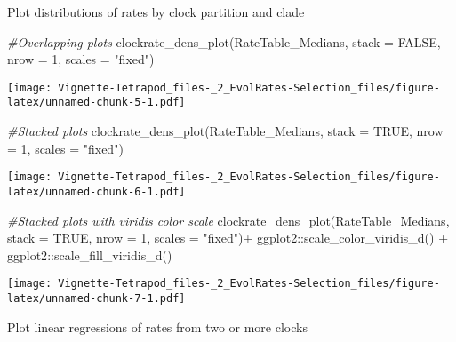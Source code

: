 \documentclass[
]{article}
\newenvironment{Shaded}{\begin{snugshade}}{\end{snugshade}}
\newcommand{\AttributeTok}[1]{\textcolor[rgb]{0.77,0.63,0.00}{#1}}
\newcommand{\CommentTok}[1]{\textcolor[rgb]{0.56,0.35,0.01}{\textit{#1}}}
\newcommand{\ConstantTok}[1]{\textcolor[rgb]{0.00,0.00,0.00}{#1}}
\newcommand{\DecValTok}[1]{\textcolor[rgb]{0.00,0.00,0.81}{#1}}
\newcommand{\FunctionTok}[1]{\textcolor[rgb]{0.00,0.00,0.00}{#1}}
\newcommand{\NormalTok}[1]{#1}
\newcommand{\SpecialCharTok}[1]{\textcolor[rgb]{0.00,0.00,0.00}{#1}}
\newcommand{\StringTok}[1]{\textcolor[rgb]{0.31,0.60,0.02}{#1}}
\begin{document}
Plot distributions of rates by clock partition and clade

\begin{Shaded}
\begin{Highlighting}[]
\CommentTok{\#Overlapping plots}
\FunctionTok{clockrate\_dens\_plot}\NormalTok{(RateTable\_Medians, }\AttributeTok{stack =} \ConstantTok{FALSE}\NormalTok{, }\AttributeTok{nrow =} \DecValTok{1}\NormalTok{, }\AttributeTok{scales =} \StringTok{"fixed"}\NormalTok{)}
\end{Highlighting}
\end{Shaded}

\texttt{[image: Vignette-Tetrapod\_files-\_2\_EvolRates-Selection\_files/figure-latex/unnamed-chunk-5-1.pdf]}

\begin{Shaded}
\begin{Highlighting}[]
\CommentTok{\#Stacked plots}
\FunctionTok{clockrate\_dens\_plot}\NormalTok{(RateTable\_Medians, }\AttributeTok{stack =} \ConstantTok{TRUE}\NormalTok{, }\AttributeTok{nrow =} \DecValTok{1}\NormalTok{, }\AttributeTok{scales =} \StringTok{"fixed"}\NormalTok{)}
\end{Highlighting}
\end{Shaded}

\texttt{[image: Vignette-Tetrapod\_files-\_2\_EvolRates-Selection\_files/figure-latex/unnamed-chunk-6-1.pdf]}

\begin{Shaded}
\begin{Highlighting}[]
\CommentTok{\#Stacked plots with viridis color scale}
\FunctionTok{clockrate\_dens\_plot}\NormalTok{(RateTable\_Medians, }\AttributeTok{stack =} \ConstantTok{TRUE}\NormalTok{, }\AttributeTok{nrow =} \DecValTok{1}\NormalTok{, }\AttributeTok{scales =} \StringTok{"fixed"}\NormalTok{)}\SpecialCharTok{+}
\NormalTok{    ggplot2}\SpecialCharTok{::}\FunctionTok{scale\_color\_viridis\_d}\NormalTok{() }\SpecialCharTok{+}
\NormalTok{    ggplot2}\SpecialCharTok{::}\FunctionTok{scale\_fill\_viridis\_d}\NormalTok{()}
\end{Highlighting}
\end{Shaded}

\texttt{[image: Vignette-Tetrapod\_files-\_2\_EvolRates-Selection\_files/figure-latex/unnamed-chunk-7-1.pdf]}

Plot linear regressions of rates from two or more clocks
\end{document}

